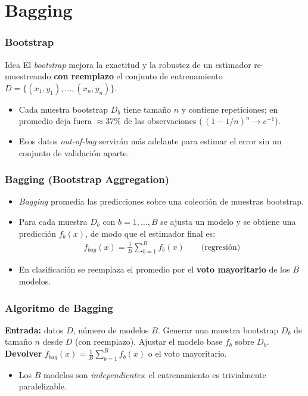 \documentclass[aspectratio=169, 10pt]{beamer}
\begin{document}
\section{Bagging}
\begin{frame}
\frametitle{Bootstrap}
\begin{block}{Idea}
El \emph{bootstrap} mejora la exactitud y la robustez de un estimador re-muestreando \textbf{con reemplazo} el conjunto de entrenamiento $D=\{(x_1,y_1),\ldots,(x_n,y_n)\}$.
\end{block}
\begin{itemize}
	\item Cada muestra bootstrap $D_b$ tiene tama\~{n}o $n$ y contiene repeticiones; en promedio deja fuera $\approx 37\%$ de las observaciones ($\,(1-1/n)^n \to e^{-1}$).
	\pause
	\item Esos datos \emph{out-of-bag} servir\'an m\'as adelante para estimar el error sin un conjunto de validaci\'on aparte.
\end{itemize}
\end{frame}

\begin{frame}
\frametitle{Bagging (Bootstrap Aggregation)}
\begin{itemize}
	\item \emph{Bagging} promedia las predicciones sobre una colecci\'on de muestras bootstrap.
	\item Para cada muestra $D_b$ con $b=1,\ldots,B$ se ajusta un modelo y se obtiene una predicci\'on $f_b(x)$, de modo que el estimador final es:
	\begin{align}
	f_{bag}(x)=\frac{1}{B} \sum_{b=1}^B f_b(x) \qquad \text{(regresi\'on)}
	\end{align}
	\item En clasificaci\'on se reemplaza el promedio por el \textbf{voto mayoritario} de los $B$ modelos.
\end{itemize}
\end{frame}

\begin{frame}
\frametitle{Algoritmo de Bagging}
\begin{algorithmic}[1]
\STATE \textbf{Entrada:} datos $D$, n\'umero de modelos $B$.
  \STATE Generar una muestra bootstrap $D_b$ de tama\~{n}o $n$ desde $D$ (con reemplazo).
  \STATE Ajustar el modelo base $f_b$ sobre $D_b$.
\ENDFOR
\STATE \textbf{Devolver} $f_{bag}(x)=\frac{1}{B}\sum_{b=1}^{B} f_b(x)$ \quad o el voto mayoritario.
\end{algorithmic}
\vspace{1em}
\begin{itemize}
	\item Los $B$ modelos son \emph{independientes}: el entrenamiento es trivialmente paralelizable.
\end{itemize}
\end{frame}
\end{document}
